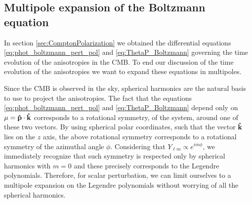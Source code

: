 \subsection{Multipole expansion of the Boltzmann equation}\label{sec:BoltzmannMultipoleExpansion}
In section \ref{sec:ComptonPolarization} we obtained the differential equations \eqref{eq:phot_boltzmann_pert_pol} and \eqref{eq:ThetaP_Boltzmann} governing the time evolution of the anisotropies in the CMB. To end our discussion of the time evolution of the anisotropies we want to expand these equations in multipoles.

Since the CMB is observed in the sky, spherical harmonics are the natural basis to use to project the anisotropies. The fact that the equations \eqref{eq:phot_boltzmann_pert_pol} and \eqref{eq:ThetaP_Boltzmann} depend only on $\mu=\mathbf{\hat{p}}\cdot\mathbf{\hat{k}}$ corresponds to a rotational symmetry, of the system, around one of these two vectors. By using spherical polar coordinates, such that the vector $\mathbf{\hat{k}}$ lies on the $z$ axis, the above rotational symmetry corresponds to a rotational symmetry of the azimuthal angle $\phi$. Considering that $Y_{\ell m}\propto e^{im\phi}$, we immediately recognize that such symmetry is respected only by spherical harmonics with $m=0$ and these precisely corresponds to the Legendre polynomials. Therefore, for scalar perturbation, we can limit ourselves to a multipole expansion on the Legendre polynomials without worrying of all the spherical harmonics.\\

